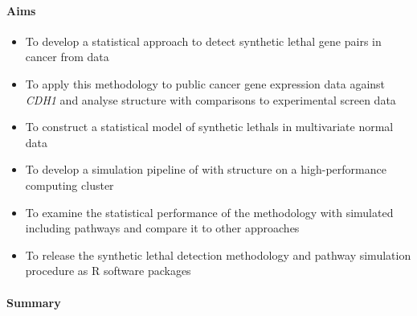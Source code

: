\iffalse
\clearpage
\paragraph{Aims}

  \begin{itemize}
   \item To develop a statistical approach to detect \gls{synthetic lethal} gene pairs in cancer from  data

   \bigskip
   
   \item To apply this methodology to public cancer \gls{gene expression} data against \textit{CDH1} and analyse  structure with comparisons to experimental screen data

   \bigskip
   
   \item To construct a statistical model of \glspl{synthetic lethal} in multivariate normal  data
 
   \bigskip
   
   \item To develop a simulation pipeline of  with  structure on a high-performance computing cluster 

   \bigskip
   
   \item To examine the statistical performance of the methodology with simulated  including pathways and compare it to other approaches

   \bigskip
   
   \item To release the \gls{synthetic lethal} detection methodology and pathway simulation procedure as R software packages
   
  \end{itemize}
  

\clearpage
  
 \paragraph{Summary}
 
